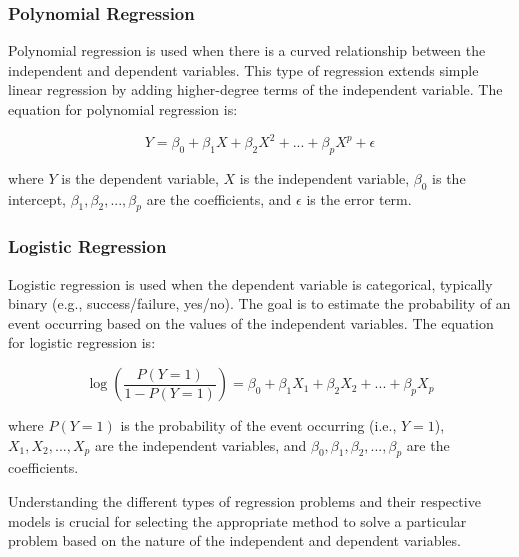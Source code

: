 \documentclass{article}
\begin{document}
\subsubsection{Polynomial Regression}

Polynomial regression is used when there is a curved relationship between the independent and dependent variables. This type of regression extends simple linear regression by adding higher-degree terms of the independent variable. The equation for polynomial regression is:

\begin{equation}
Y = \beta_0 + \beta_1X + \beta_2X^2 + ... + \beta_pX^p + \epsilon
\end{equation}

where $Y$ is the dependent variable, $X$ is the independent variable, $\beta_0$ is the intercept, $\beta_1, \beta_2, ..., \beta_p$ are the coefficients, and $\epsilon$ is the error term.

\subsubsection{Logistic Regression}

Logistic regression is used when the dependent variable is categorical, typically binary (e.g., success/failure, yes/no). The goal is to estimate the probability of an event occurring based on the values of the independent variables. The equation for logistic regression is:

\begin{equation}
\log\left(\frac{P(Y=1)}{1-P(Y=1)}\right) = \beta_0 + \beta_1X_1 + \beta_2X_2 + ... + \beta_pX_p
\end{equation}

where $P(Y=1)$ is the probability of the event occurring (i.e., $Y=1$), $X_1, X_2, ..., X_p$ are the independent variables, and $\beta_0, \beta_1, \beta_2, ..., \beta_p$ are the coefficients.

Understanding the different types of regression problems and their respective models is crucial for selecting the appropriate method to solve a particular problem based on the nature of the independent and dependent variables.
\end{document}
